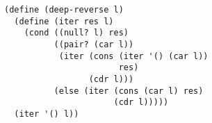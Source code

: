 \documentclass[a4paper,12pt]{article}
\begin{document}
\begin{lstlisting}
(define (deep-reverse l)
  (define (iter res l)
    (cond ((null? l) res)
          ((pair? (car l))
           (iter (cons (iter '() (car l))
                       res)
                 (cdr l)))
          (else (iter (cons (car l) res)
                      (cdr l)))))
  (iter '() l))
\end{lstlisting}
\end{document}
